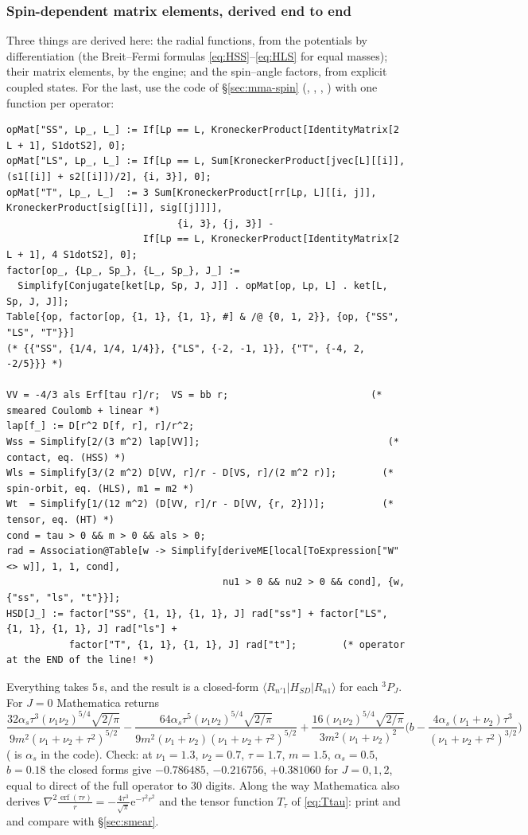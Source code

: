 \documentclass[11pt,a4paper]{article}
\numberwithin{equation}{section}
\theoremstyle{definition}
\theoremstyle{plain}
\theoremstyle{remark}
\numberwithin{algorithm}{section}
\newcommand{\as}{\alpha_s}
\newcommand{\ee}{\mathrm{e}}
\newcommand{\erf}{\operatorname{erf}}
\begin{document}
\subsubsection{Spin-dependent matrix elements, derived end to end}
Three things are derived here: the radial functions, from the potentials by differentiation (the Breit--Fermi formulas \eqref{eq:HSS}--\eqref{eq:HLS} for equal masses); their matrix elements, by the engine; and the spin--angle factors, from explicit coupled states. For the last, use the code of \S\ref{sec:mma-spin} (, , , ) with one function per operator:
\begin{lstlisting}[style=wl]
opMat["SS", Lp_, L_] := If[Lp == L, KroneckerProduct[IdentityMatrix[2 L + 1], S1dotS2], 0];
opMat["LS", Lp_, L_] := If[Lp == L, Sum[KroneckerProduct[jvec[L][[i]], (s1[[i]] + s2[[i]])/2], {i, 3}], 0];
opMat["T", Lp_, L_]  := 3 Sum[KroneckerProduct[rr[Lp, L][[i, j]], KroneckerProduct[sig[[i]], sig[[j]]]],
                              {i, 3}, {j, 3}] -
                        If[Lp == L, KroneckerProduct[IdentityMatrix[2 L + 1], 4 S1dotS2], 0];
factor[op_, {Lp_, Sp_}, {L_, Sp_}, J_] :=
  Simplify[Conjugate[ket[Lp, Sp, J, J]] . opMat[op, Lp, L] . ket[L, Sp, J, J]];
Table[{op, factor[op, {1, 1}, {1, 1}, #] & /@ {0, 1, 2}}, {op, {"SS", "LS", "T"}}]
(* {{"SS", {1/4, 1/4, 1/4}}, {"LS", {-2, -1, 1}}, {"T", {-4, 2, -2/5}}} *)

VV = -4/3 als Erf[tau r]/r;  VS = bb r;                         (* smeared Coulomb + linear *)
lap[f_] := D[r^2 D[f, r], r]/r^2;
Wss = Simplify[2/(3 m^2) lap[VV]];                                 (* contact, eq. (HSS) *)
Wls = Simplify[3/(2 m^2) D[VV, r]/r - D[VS, r]/(2 m^2 r)];        (* spin-orbit, eq. (HLS), m1 = m2 *)
Wt  = Simplify[1/(12 m^2) (D[VV, r]/r - D[VV, {r, 2}])];          (* tensor, eq. (HT) *)
cond = tau > 0 && m > 0 && als > 0;
rad = Association@Table[w -> Simplify[deriveME[local[ToExpression["W" <> w]], 1, 1, cond],
                                      nu1 > 0 && nu2 > 0 && cond], {w, {"ss", "ls", "t"}}];
HSD[J_] := factor["SS", {1, 1}, {1, 1}, J] rad["ss"] + factor["LS", {1, 1}, {1, 1}, J] rad["ls"] +
           factor["T", {1, 1}, {1, 1}, J] rad["t"];        (* operator at the END of the line! *)
\end{lstlisting}
Everything takes $5\,$s, and the result is a closed-form $\langle R_{n'1}|H_{SD}|R_{n1}\rangle$ for each ${}^3P_J$. For $J=0$ Mathematica returns
\[
\frac{32\as\tau^3(\nu_1\nu_2)^{5/4}\sqrt{2/\pi}}{9m^2(\nu_1+\nu_2+\tau^2)^{5/2}}
-\frac{64\as\tau^5(\nu_1\nu_2)^{5/4}\sqrt{2/\pi}}{9m^2(\nu_1+\nu_2)(\nu_1+\nu_2+\tau^2)^{5/2}}
+\frac{16(\nu_1\nu_2)^{5/4}\sqrt{2/\pi}}{3m^2(\nu_1+\nu_2)^2}\Big(b-\frac{4\as(\nu_1+\nu_2)\tau^3}{(\nu_1+\nu_2+\tau^2)^{3/2}}\Big)
\]
( is $\as$ in the code). Check: at $\nu_1=1.3$, $\nu_2=0.7$, $\tau=1.7$, $m=1.5$, $\as=0.5$, $b=0.18$ the closed forms give $-0.786485$, $-0.216756$, $+0.381060$ for $J=0,1,2$, equal to direct  of the full operator to 30 digits. Along the way Mathematica also derives $\nabla^2\frac{\erf(\tau r)}r=-\frac{4\tau^3}{\sqrt\pi}\ee^{-\tau^2r^2}$ and the tensor function $T_\tau$ of \eqref{eq:Ttau}: print  and  and compare with \S\ref{sec:smear}.
\end{document}
